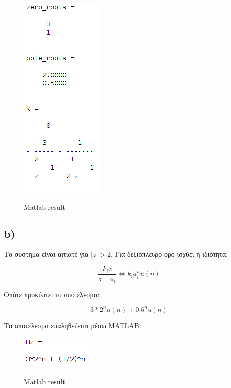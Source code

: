 \documentclass[11pt]{article}
\begin{document}
\begin{figure}[H]
    \centering
   \includegraphics[scale=0.7]{photos/2-a_zeros_poles_and_k.png} \\
    \caption{Matlab result}
\end{figure}

\subsection*{b)}
Το σύστημα είναι αιτιατό για $|z| > 2$.
Για δεξιόπλευρο όρο ισχύει η ιδιότητα:

\[
       \frac{k_i z}{z-a_i} \Leftrightarrow k_i a_i^n u(n)
\] 

\par \noindent
Οπότε προκύπτει το αποτέλεσμα:

\[
    3 * 2^n u(n) + 0.5^n u(n)
\] 

\par \noindent
Το αποτέλεσμα επαληθεύεται μέσω MATLAB:

\begin{figure}[H]
    \centering
    \includegraphics[scale=0.7]{photos/H_z.png} \\
    \caption{Matlab result }
\end{figure}
\end{document}
